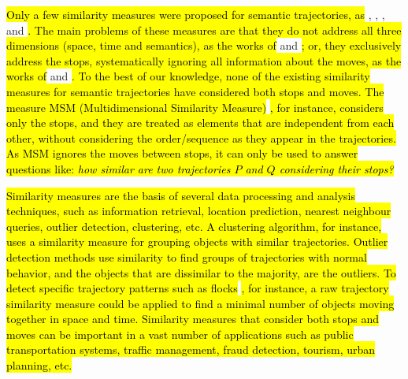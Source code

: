 \documentclass[12pt]{article}
\begin{document}
\hl{Only a few  similarity measures were proposed for semantic trajectories, as } \cite{Kang:2009:SMT:1529282.1529580}, \cite{Liu:2012:SMM:2442968.2442971}, \cite{Ying:2010:MUS:1867699.1867703}, and \cite{Furtado:TGIS12156}\hl{. The main problems of these measures are that they do not address all three dimensions (space, time and semantics), as the works of }\cite{Kang:2009:SMT:1529282.1529580} and \cite{Liu:2012:SMM:2442968.2442971}\hl{; or, 
they exclusively address the stops, systematically ignoring all information about the moves, as the works of }\cite{Ying:2010:MUS:1867699.1867703} and \cite{Furtado:TGIS12156}\hl{. To the best of our knowledge, none of the existing similarity measures for semantic trajectories have considered both stops and moves. The measure MSM (Multidimensional Similarity Measure) }\citep{Furtado:TGIS12156}\hl{, for instance, considers only the stops, and they are treated as elements that are independent from each other, without considering the order/sequence as they appear in the trajectories. As MSM ignores the moves between stops, it can only be used to answer questions like: \emph{how similar are two trajectories $P$ and $Q$ considering their stops?}}

 

\hl{Similarity measures are the basis of several data processing and analysis techniques, such as information retrieval, location prediction, nearest neighbour queries, outlier detection, clustering, etc. A clustering algorithm, for instance, uses a similarity measure for grouping objects with similar trajectories. Outlier detection methods use similarity to find groups of trajectories with normal behavior, and the objects that are dissimilar to the majority, are the outliers. To detect specific trajectory patterns such as flocks }\citep{Laube2005}\hl{, for instance, a raw trajectory similarity measure could be applied to find a minimal number of objects moving together in space and time. Similarity measures that consider both stops and moves can be important in a vast number of applications such as public transportation systems, traffic management, fraud detection, tourism, urban planning, etc. }
\end{document}
